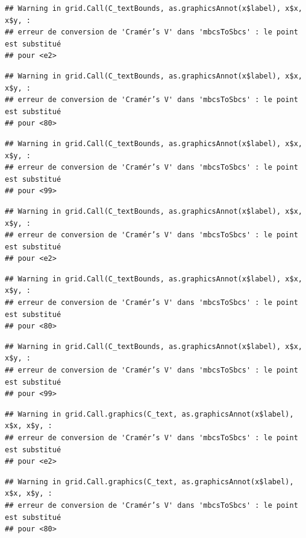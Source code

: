 \documentclass[
]{article}
\begin{document}
\begin{verbatim}
## Warning in grid.Call(C_textBounds, as.graphicsAnnot(x$label), x$x, x$y, :
## erreur de conversion de 'Cramér’s V' dans 'mbcsToSbcs' : le point est substitué
## pour <e2>
\end{verbatim}

\begin{verbatim}
## Warning in grid.Call(C_textBounds, as.graphicsAnnot(x$label), x$x, x$y, :
## erreur de conversion de 'Cramér’s V' dans 'mbcsToSbcs' : le point est substitué
## pour <80>
\end{verbatim}

\begin{verbatim}
## Warning in grid.Call(C_textBounds, as.graphicsAnnot(x$label), x$x, x$y, :
## erreur de conversion de 'Cramér’s V' dans 'mbcsToSbcs' : le point est substitué
## pour <99>
\end{verbatim}

\begin{verbatim}
## Warning in grid.Call(C_textBounds, as.graphicsAnnot(x$label), x$x, x$y, :
## erreur de conversion de 'Cramér’s V' dans 'mbcsToSbcs' : le point est substitué
## pour <e2>
\end{verbatim}

\begin{verbatim}
## Warning in grid.Call(C_textBounds, as.graphicsAnnot(x$label), x$x, x$y, :
## erreur de conversion de 'Cramér’s V' dans 'mbcsToSbcs' : le point est substitué
## pour <80>
\end{verbatim}

\begin{verbatim}
## Warning in grid.Call(C_textBounds, as.graphicsAnnot(x$label), x$x, x$y, :
## erreur de conversion de 'Cramér’s V' dans 'mbcsToSbcs' : le point est substitué
## pour <99>
\end{verbatim}

\begin{verbatim}
## Warning in grid.Call.graphics(C_text, as.graphicsAnnot(x$label), x$x, x$y, :
## erreur de conversion de 'Cramér’s V' dans 'mbcsToSbcs' : le point est substitué
## pour <e2>
\end{verbatim}

\begin{verbatim}
## Warning in grid.Call.graphics(C_text, as.graphicsAnnot(x$label), x$x, x$y, :
## erreur de conversion de 'Cramér’s V' dans 'mbcsToSbcs' : le point est substitué
## pour <80>
\end{verbatim}
\end{document}

